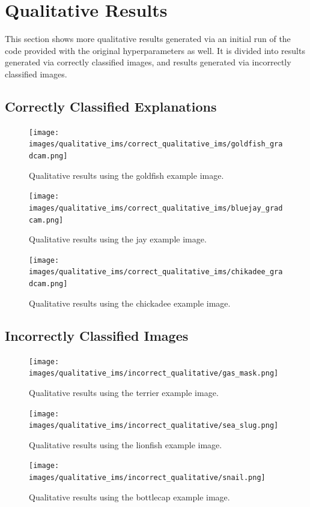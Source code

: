 \appendix
\section{Qualitative Results}\label{app:qualitative-results}
This section shows more qualitative results generated via an initial run of the code provided with the original hyperparameters as well. It is divided into results generated via correctly classified images, and results generated via incorrectly classified images.
\subsection{Correctly Classified Explanations}
\begin{figure}[H]
    \centering
    \texttt{[image: images/qualitative\_ims/correct\_qualitative\_ims/goldfish\_gradcam.png]}
    \caption{Qualitative results using the goldfish example image.}
    \label{fig:app-goldfish}
\end{figure}
\begin{figure}[H]
    \centering
    \texttt{[image: images/qualitative\_ims/correct\_qualitative\_ims/bluejay\_gradcam.png]}
    \caption{Qualitative results using the jay example image.}
    \label{fig:app-jay}
\end{figure}
\begin{figure}[H]
    \centering
    \texttt{[image: images/qualitative\_ims/correct\_qualitative\_ims/chikadee\_gradcam.png]}
    \caption{Qualitative results using the chickadee example image.}
    \label{fig:app-chickadee}
\end{figure}
\subsection{Incorrectly Classified Images}


\begin{figure}[H]
    \centering
    \texttt{[image: images/qualitative\_ims/incorrect\_qualitative/gas\_mask.png]}
    \caption{Qualitative results using the terrier example image.}
    \label{fig:app:terrier}
\end{figure}
\begin{figure}[H]
    \centering
    \texttt{[image: images/qualitative\_ims/incorrect\_qualitative/sea\_slug.png]}
    \caption{Qualitative results using the lionfish example image.}
    \label{fig:app-lionfish}
\end{figure}
\begin{figure}[H]
    \centering
    \texttt{[image: images/qualitative\_ims/incorrect\_qualitative/snail.png]}
    \caption{Qualitative results using the bottlecap example image.}
    \label{fig:app-bottlecap}

\end{figure}

